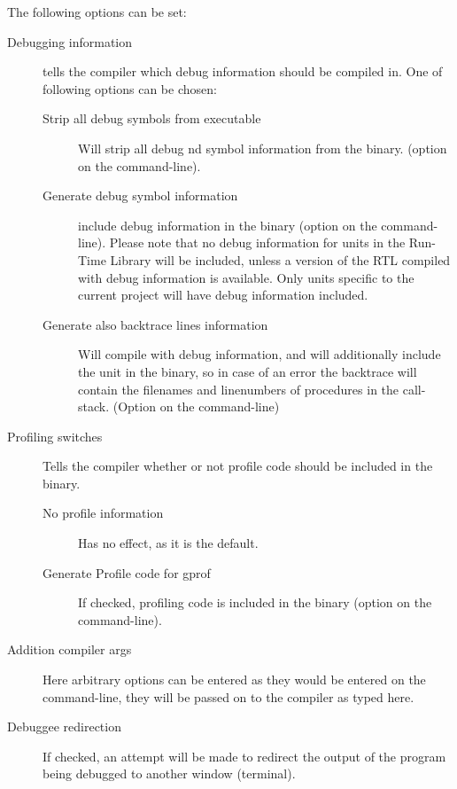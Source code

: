 The following options can be set:
\begin{description}
\item[Debugging information] tells the compiler which debug information
should be compiled in. One of following options can be chosen:
\begin{description}
\item[Strip all debug symbols from executable] Will strip all debug nd
symbol information from the binary. (option  on the command-line).
\item[Generate debug symbol information] include debug information in the
binary (option  on the command-line). Please note that no debug
information for units in the Run-Time Library will be included, unless a
version of the RTL compiled with debug information is available. Only units
specific to the current project will have debug information included.
\item[Generate also backtrace lines information] Will compile with debug
information, and will additionally include the  unit in the
binary, so in case of an error the backtrace will contain the filenames and
linenumbers of procedures in the call-stack. (Option  on the
command-line)
\end{description}
\item[Profiling switches] Tells the compiler whether or not profile code
should be included in the binary.
\begin{description}
\item[No profile information] Has no effect, as it is the default.
\item[Generate Profile code for gprof] If checked, profiling code is
included in the binary (option  on the command-line).
\end{description}
\item[Addition compiler args] Here arbitrary options can be entered as they
would be entered on the command-line, they will be passed on to the compiler
as typed here.
\item[Debuggee redirection]
If checked, an attempt will be made to redirect the output of the program
being debugged to another window (terminal).
\end{description}

%
%
